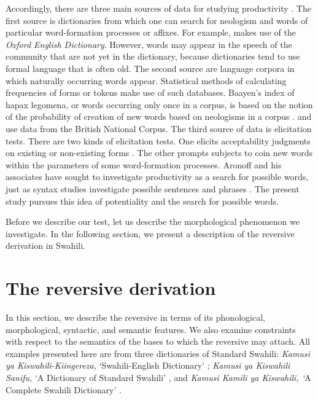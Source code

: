 \documentclass[output=paper]{langsci/langscibook}
\begin{document}
Accordingly, there are three main sources of data for studying productivity \citep{Plag2006,SchroederMuehleisen2010,Bolozky1999}. The first source is dictionaries from which one can search for neologism and words of particular word-formation processes or affixes. For example, \citet{Fernandez-Dominguez2013} makes use of the \textit{Oxford English Dictionary}. However, words may appear in the speech of the community that are not yet in the dictionary, because dictionaries tend to use formal language that is often old. The second source are language corpora in which naturally occurring words appear. Statistical methods of calculating frequencies of forms or tokens make use of such databases. Baayen’s index of hapax legomena, or words occurring only once in a corpus, is based on the notion of the probability of creation of new words based on neologisms in a corpus \citep{Baayen1992}. \citet{Plag2006} and \citet{Fernandez-Dominguez2013} use data from the British National Corpus. The third source of data is elicitation tests. There are two kinds of elicitation tests. One elicits acceptability judgments on existing or non-existing forms \citep{AronoffSchvaneveldt1978}. The other prompts subjects to coin new words within the parameters of some word-formation processes. Aronoff and his associates have sought to investigate productivity as a search for possible words, just as syntax studies investigate possible sentences and phrases \citep{Aronoff1976}. The present study pursues this idea of potentiality and the search for possible words.

Before we describe our test, let us describe the morphological phenomenon we investigate. In the following section, we present a description of the reversive derivation in Swahili. 

\section{The reversive derivation} \label{sec:ngonyaningowa:3}

In this section, we describe the reversive in terms of its phonological, morphological, syntactic, and semantic features. We also examine constraints with respect to the semantics of the bases to which the reversive may attach. All examples presented here are from three dictionaries of Standard Swahili: \textit{Kamusi ya Kiswahili-Kiingereza,} ‘Swahili-English Dictionary’ \citep{TUKI2001}; \textit{Kamusi ya Kiswahili Sanifu, }‘A Dictionary of Standard Swahili’ \citep{TUKI2004}, and \textit{Kamusi Kamili ya Kiswahili, ‘}A Complete Swahili Dictionary’ \citep{Mdeeetal2009}.
\end{document}
